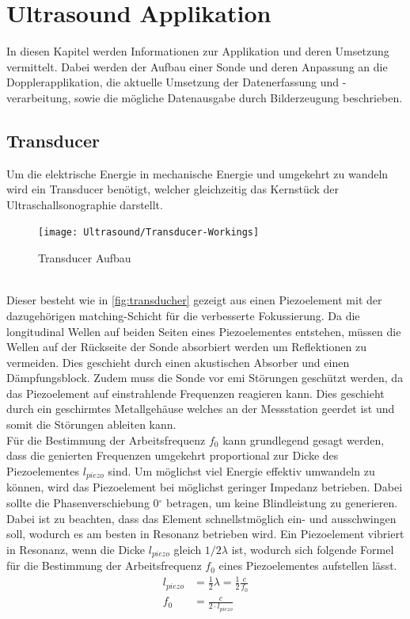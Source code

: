 \chapter{Ultrasound Applikation}
In diesen Kapitel werden Informationen zur Applikation und deren Umsetzung vermittelt. Dabei werden der Aufbau einer Sonde und deren Anpassung an die Dopplerapplikation, die aktuelle Umsetzung der Datenerfassung und -verarbeitung, sowie die mögliche Datenausgabe durch Bilderzeugung beschrieben.
\section{Transducer}
Um die elektrische Energie in mechanische Energie und umgekehrt zu wandeln wird ein Transducer benötigt, welcher gleichzeitig das Kernstück der Ultraschallsonographie darstellt.
\begin{figure}[ht]
\centering
  	\texttt{[image: Ultrasound/Transducer-Workings]} 
  \caption[Transducer Aufbau]{Transducer Aufbau \cite{agnieszka}}
  \label{fig:transducher}
\end{figure}\\
Dieser besteht wie in \autoref{fig:transducher} gezeigt aus einen Piezoelement mit der dazugehörigen matching-Schicht für die verbesserte Fokussierung. Da die longitudinal Wellen auf beiden Seiten eines Piezoelementes entstehen, müssen die Wellen auf der Rückseite der Sonde absorbiert werden um Reflektionen zu vermeiden. Dies geschieht durch einen akustischen Absorber und einen Dämpfungsblock. Zudem muss die Sonde vor \ac{emi} Störungen geschützt werden, da das Piezoelement auf einstrahlende Frequenzen reagieren kann. Dies geschieht durch ein geschirmtes Metallgehäuse welches an der Messstation geerdet ist und somit die Störungen ableiten kann.\\
Für die Bestimmung der Arbeitsfrequenz $f_0$ kann grundlegend gesagt werden, dass die genierten Frequenzen umgekehrt proportional zur Dicke des Piezoelementes $l_{piezo}$ sind. Um möglichst viel Energie effektiv umwandeln zu können, wird das Piezoelement bei möglichst geringer Impedanz betrieben. Dabei sollte die Phasenverschiebung 0$^\circ$ betragen, um keine Blindleistung zu generieren. Dabei ist zu beachten, dass das Element schnellstmöglich ein- und ausschwingen soll, wodurch es am besten in Resonanz betrieben wird. Ein Piezoelement vibriert in Resonanz, wenn die Dicke $l_{piezo}$ gleich $1/2\lambda$ ist\cite[S. 35]{brucher_ultra}, wodurch sich folgende Formel für die Bestimmung der Arbeitsfrequenz $f_0$ eines Piezoelementes aufstellen lässt.
\begin{align}
l_{piezo}&=\frac{1}{2}\lambda =\frac{1}{2} \frac{c}{f_0}\\
f_0&=\frac{c}{2\cdot l_{piezo}}
\end{align}
